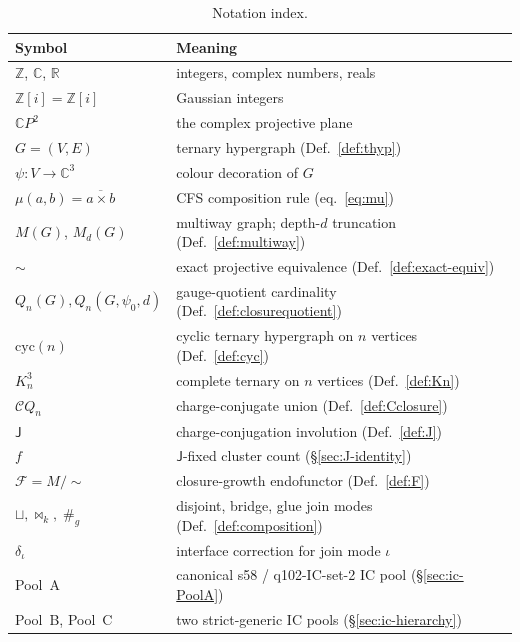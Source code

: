 \documentclass[12pt,a4paper]{article}
\theoremstyle{definition}
\theoremstyle{remark}
\newcommand{\bZ}{\mathbb{Z}}
\newcommand{\bZi}{\mathbb{Z}[i]}            %
\newcommand{\bC}{\mathbb{C}}
\newcommand{\bR}{\mathbb{R}}
\newcommand{\Kn}{K_n^3}
\newcommand{\Qn}{Q_n}
\newcommand{\Ccls}{\mathcal{C}}             %
\newcommand{\Fcls}{\mathcal{F}}             %
\newcommand{\Jconj}{\mathsf{J}}             %
\newcommand{\cyc}{\mathrm{cyc}}
\newcommand{\proj}{\mathrel{\sim}}          %
\newcommand{\bridge}{\mathbin{\bowtie}}     %
\newcommand{\glue}{\mathbin{\#}}            %
\begin{document}
\begin{table}[H]\small
\centering
\caption{Notation index.}\label{tab:notation}
\begin{tabular}{@{}ll@{}}
\toprule
Symbol & Meaning \\
\midrule
$\bZ$, $\bC$, $\bR$ & integers, complex numbers, reals \\
$\bZi = \bZ[i]$ & Gaussian integers \\
$\bC P^2$ & the complex projective plane \\
$G = (V, E)$ & ternary hypergraph (Def.~\ref{def:thyp}) \\
$\psi : V \to \bC^3$ & colour decoration of $G$ \\
$\mu(a, b) = \overline{a \times b}$ & CFS composition rule (eq.~\ref{eq:mu}) \\
$M(G)$, $M_d(G)$ & multiway graph; depth-$d$ truncation (Def.~\ref{def:multiway}) \\
$\proj$ & exact projective equivalence (Def.~\ref{def:exact-equiv}) \\
$\Qn(G), \Qn(G, \psi_0, d)$ & gauge-quotient cardinality (Def.~\ref{def:closurequotient}) \\
$\cyc(n)$ & cyclic ternary hypergraph on $n$ vertices (Def.~\ref{def:cyc}) \\
$\Kn$ & complete ternary on $n$ vertices (Def.~\ref{def:Kn}) \\
$\Ccls\Qn$ & charge-conjugate union (Def.~\ref{def:Cclosure}) \\
$\Jconj$ & charge-conjugation involution (Def.~\ref{def:J}) \\
$f$ & $\Jconj$-fixed cluster count (\S\ref{sec:J-identity}) \\
$\Fcls = M/{\sim}$ & closure-growth endofunctor (Def.~\ref{def:F}) \\
$\sqcup, \bridge_k, \glue_g$ & disjoint, bridge, glue join modes (Def.~\ref{def:composition}) \\
$\delta_\iota$ & interface correction for join mode $\iota$ \\
Pool~A & canonical s58 / q102-IC-set-2 IC pool (\S\ref{sec:ic-PoolA}) \\
Pool~B, Pool~C & two strict-generic IC pools (\S\ref{sec:ic-hierarchy}) \\
\bottomrule
\end{tabular}
\end{table}
\end{document}
